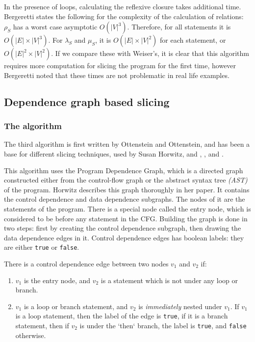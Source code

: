 \documentclass[oneside,12pt,a4paper]{book}
\begin{document}
In the presence of loops, calculating the reflexive closure takes additional time. Bergeretti states the following for the complexity of the calculation of relations: $\rho_S$ has a worst case asymptotic $O(|V|^3)$. Therefore, for all statements it is $O(|E| \times |V|^3)$. For $\lambda_S$ and $\mu_S$, it is $O(|E| \times |V|^2)$ for each statement, or $O(|E|^2 \times |V|^2)$. 
If we compare these with Weiser's, it is clear that this algorithm requires more computation for slicing the program for the first time, however Bergeretti noted that these times are not problematic in real life examples.



\subsection{Dependence graph based slicing}
\subsubsection{The algorithm}
The third algorithm is first written by Ottenstein and Ottenstein\cite{ottenstein}, and has been a base for different slicing techniques, used by Susan Horwitz\cite{horwitz-interproc}, and \cite{use-of-slicing-horwitz}, \cite{program-analysis-via-graph-reachability-reps}, \cite{slicing-with-jumps} and \cite{slicing-oop}.  

This algorithm uses the Program Dependence Graph, which is a directed graph constructed either from the control-flow graph or the abstract syntax tree \textit{(AST)} of the program. Horwitz describes this graph thoroughly in her paper\cite{horwitz-interproc}. It contains the control dependence and data dependence subgraphs. The nodes of it are the statements of the program. There is a special node called the entry node, which is considered to be before any statement in the CFG. Building the graph is done in two steps: first by creating the control dependence subgraph, then drawing the data dependence edges in it. Control dependence edges has boolean labels: they are either \texttt{true} or \texttt{false}.

There is a control dependence edge between two nodes $v_1$ and $v_2$ if:
\begin{enumerate}
\item $v_1$ is the entry node, and $v_2$ is a statement which is not under any loop or branch.
\item $v_1$ is a loop or branch statement, and $v_2$ is \textit{immediately} nested under $v_1$. If $v_1$ is a loop statement, then the label of the edge is \texttt{true}, if it is a branch statement, then if $v_2$ is under the `then` branch, the label is \texttt{true}, and \texttt{false} otherwise.
\end{enumerate}
\end{document}
